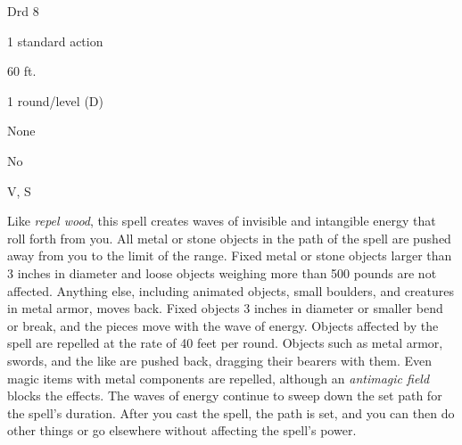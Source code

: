 
\begin{description*}
\item[Level:] Drd 8
\item[Casting Time:] 1 standard action
\item[Range:] 60 ft.
\item[Duration:] 1 round/level (D)
\item[Saving Throw:] None
\item[Spell Resistance:] No
\item[Components:] V, S
\end{description*}

Like \textit{repel wood}, this spell creates waves of invisible and intangible
energy that roll forth from you. All metal or stone objects in the path of the
spell are pushed away from you to the limit of the range. Fixed metal or stone
objects larger than 3 inches in diameter and loose objects weighing more than 500
pounds are not affected. Anything else, including animated objects, small boulders,
and creatures in metal armor, moves back. Fixed objects 3 inches in diameter or
smaller bend or break, and the pieces move with the wave of energy. Objects affected
by the spell are repelled at the rate of 40 feet per round.
Objects such as metal armor, swords, and the like are pushed back, dragging their
bearers with them. Even magic items with metal components are repelled, although
an \textit{antimagic field} blocks the effects.
The waves of energy continue to sweep down the set path for the spell's duration.
After you cast the spell, the path is set, and you can then do other things or
go elsewhere without affecting the spell's power.